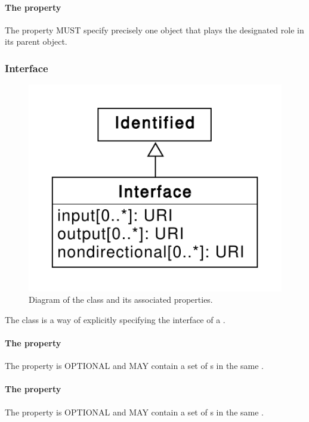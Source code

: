 \paragraph{The  property}\label{sec:participant}

The  property MUST specify precisely one  object that plays the designated role in its parent  object.

\subsubsection{Interface}
\label{sec:Interface}

\begin{figure}[ht]
\begin{center}
\includegraphics[scale=0.6]{uml/interface}
\caption[]{Diagram of the  class and its associated properties.}
\label{uml:interface}
\end{center}
\end{figure}

The  class is a way of explicitly specifying the interface of a . 

\paragraph{The  property}
\label{sec:input:Interface}
The  property is OPTIONAL and MAY contain a set of  s in the same .
\paragraph{The  property}
\label{sec:output:Interface}
The  property is OPTIONAL and MAY contain a set of  s in the same .

